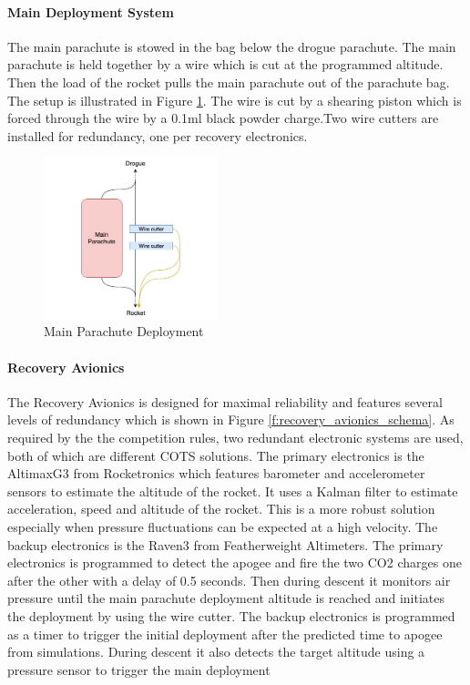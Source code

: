\paragraph{Main Deployment System}
\hfill \break
The main parachute is stowed in the bag below the drogue parachute. The main parachute is held together by a wire which is cut at the programmed altitude. Then the load of the rocket pulls the main parachute out of the parachute bag. The setup is illustrated in Figure \ref{f:recovery_main_deployment}. The wire is cut by a shearing piston which is forced through the wire by a 0.1ml black powder charge.Two wire cutters are installed for redundancy, one per recovery electronics.

\begin{figure}[h!]
 	\centering
        \includegraphics[width=0.45\textwidth]{img/recovery_main_deployment.jpg}
        \caption{Main Parachute Deployment}
        \label{f:recovery_main_deployment}
 \end{figure}

 \paragraph{Recovery Avionics}
 \hfill \break
The Recovery Avionics is designed for maximal reliability and features several levels of redundancy which is shown in Figure \ref{f:recovery_avionics_schema}. As required by the the competition rules, two redundant electronic systems are used, both of which are different COTS solutions.
The primary electronics is the AltimaxG3 from Rocketronics which features barometer and accelerometer sensors to estimate the altitude of the rocket. It uses a Kalman filter to estimate acceleration, speed and altitude of the rocket. This is a more robust solution especially when pressure fluctuations can be expected at a high velocity.
The backup electronics is the Raven3 from Featherweight Altimeters.
The primary electronics is programmed to detect the apogee and fire the two CO2 charges one after the other with a delay of 0.5 seconds. Then during descent it monitors air pressure until the main parachute deployment altitude is reached and initiates the deployment by using the wire cutter.
 The backup electronics is programmed as a timer to trigger the initial deployment after the predicted time to apogee from simulations. During descent it also detects the target altitude using a pressure sensor to trigger the main deployment

